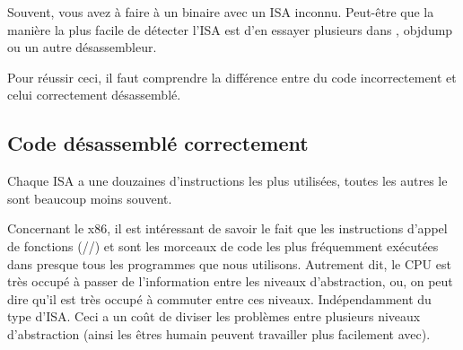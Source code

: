 ﻿
\label{ISA_detect}

Souvent, vous avez à faire à un binaire avec un \ac{ISA} inconnu.
Peut-être que la manière la plus facile de détecter l'\ac{ISA} est d'en essayer plusieurs
dans \IDA, objdump ou un autre désassembleur.

Pour réussir ceci, il faut comprendre la différence entre du code incorrectement
et celui correctement désassemblé.

\renewcommand{\CURPATH}{digging_into_code/incorrect_disassembly}


\subsection{Code désassemblé correctement}
\label{correctly_disasmed_code}

Chaque \ac{ISA} a une douzaines d'instructions les plus utilisées, toutes les autres
le sont beaucoup moins souvent.

Concernant le x86, il est intéressant de savoir le fait que les instructions d'appel
de fonctions (\PUSH/\CALL/\ADD) et \MOV sont les morceaux de code les plus fréquemment
exécutées dans presque tous les programmes que nous utilisons.
Autrement dit, le \ac{CPU} est très occupé à passer de l'information entre les niveaux
d'abstraction, ou, on peut dire qu'il est très occupé à commuter entre ces niveaux.
Indépendamment du type d'\ac{ISA}.
Ceci a un coût de diviser les problèmes entre plusieurs niveaux d'abstraction (ainsi
les êtres humain peuvent travailler plus facilement avec).

